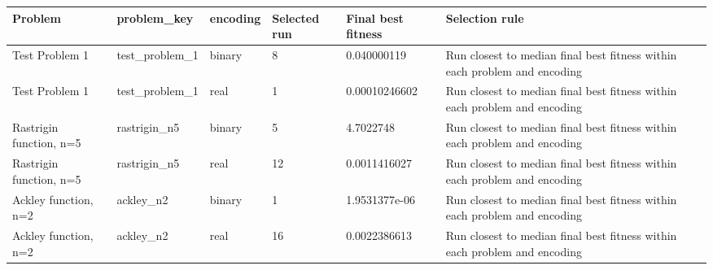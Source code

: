 \begin{tabular}{llllll}
\hline
Problem & problem\_key & encoding & Selected run & Final best fitness & Selection rule \\
\hline
Test Problem 1 & test\_problem\_1 & binary & 8 & 0.040000119 & Run closest to median final best fitness within each problem and encoding \\
Test Problem 1 & test\_problem\_1 & real & 1 & 0.00010246602 & Run closest to median final best fitness within each problem and encoding \\
Rastrigin function, n=5 & rastrigin\_n5 & binary & 5 & 4.7022748 & Run closest to median final best fitness within each problem and encoding \\
Rastrigin function, n=5 & rastrigin\_n5 & real & 12 & 0.0011416027 & Run closest to median final best fitness within each problem and encoding \\
Ackley function, n=2 & ackley\_n2 & binary & 1 & 1.9531377e-06 & Run closest to median final best fitness within each problem and encoding \\
Ackley function, n=2 & ackley\_n2 & real & 16 & 0.0022386613 & Run closest to median final best fitness within each problem and encoding \\
\hline
\end{tabular}
